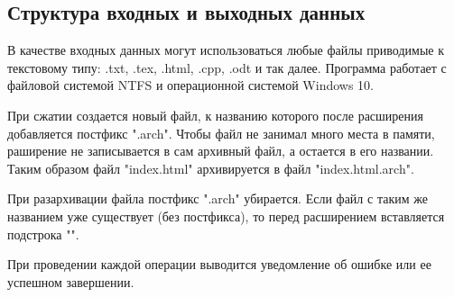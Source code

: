 \subsection{Структура входных и выходных данных}

В качестве входных данных могут использоваться любые файлы приводимые к текстовому типу: .txt, .tex, .html, .cpp, .odt и так далее. 
Программа работает с файловой системой NTFS и операционной системой Windows 10.



При сжатии создается новый файл, к названию которого после расширения добавляется постфикс ".arch".
Чтобы файл не занимал много места в памяти, раширение не записывается в сам архивный файл, а остается в его названии.
Таким образом файл "index.html" архивируется в файл "index.html.arch".



При разархивации файла постфикс ".arch" убирается. 
Если файл с таким же названием уже существует (без постфикса), то перед расширением вставляется подстрока "".



При проведении каждой операции выводится уведомление об ошибке или ее успешном завершении.